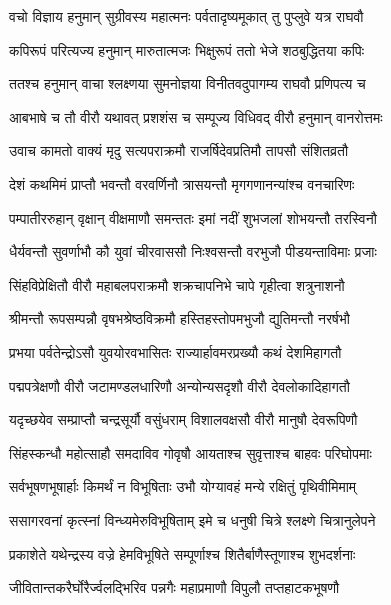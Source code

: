 
\twolineshloka
{वचो विज्ञाय हनुमान् सुग्रीवस्य महात्मनः}
{पर्वतादृष्यमूकात् तु पुप्लुवे यत्र राघवौ} %

\twolineshloka
{कपिरूपं परित्यज्य हनुमान् मारुतात्मजः}
{भिक्षुरूपं ततो भेजे शठबुद्धितया कपिः} %

\twolineshloka
{ततश्च हनुमान् वाचा श्लक्ष्णया सुमनोज्ञया}
{विनीतवदुपागम्य राघवौ प्रणिपत्य च} %

\twolineshloka
{आबभाषे च तौ वीरौ यथावत् प्रशशंस च}
{सम्पूज्य विधिवद् वीरौ हनुमान् वानरोत्तमः} %

\twolineshloka
{उवाच कामतो वाक्यं मृदु सत्यपराक्रमौ}
{राजर्षिदेवप्रतिमौ तापसौ संशितव्रतौ} %

\twolineshloka
{देशं कथमिमं प्राप्तौ भवन्तौ वरवर्णिनौ}
{त्रासयन्तौ मृगगणानन्यांश्च वनचारिणः} %

\twolineshloka
{पम्पातीररुहान् वृक्षान् वीक्षमाणौ समन्ततः}
{इमां नदीं शुभजलां शोभयन्तौ तरस्विनौ} %

\twolineshloka
{धैर्यवन्तौ सुवर्णाभौ कौ युवां चीरवाससौ}
{निःश्वसन्तौ वरभुजौ पीडयन्ताविमाः प्रजाः} %

\twolineshloka
{सिंहविप्रेक्षितौ वीरौ महाबलपराक्रमौ}
{शक्रचापनिभे चापे गृहीत्वा शत्रुनाशनौ} %

\twolineshloka
{श्रीमन्तौ रूपसम्पन्नौ वृषभश्रेष्ठविक्रमौ}
{हस्तिहस्तोपमभुजौ द्युतिमन्तौ नरर्षभौ} %

\twolineshloka
{प्रभया पर्वतेन्द्रोऽसौ युवयोरवभासितः}
{राज्यार्हावमरप्रख्यौ कथं देशमिहागतौ} %

\twolineshloka
{पद्मपत्रेक्षणौ वीरौ जटामण्डलधारिणौ}
{अन्योन्यसदृशौ वीरौ देवलोकादिहागतौ} %

\twolineshloka
{यदृच्छयेव सम्प्राप्तौ चन्द्रसूर्यौ वसुंधराम्}
{विशालवक्षसौ वीरौ मानुषौ देवरूपिणौ} %

\twolineshloka
{सिंहस्कन्धौ महोत्साहौ समदाविव गोवृषौ}
{आयताश्च सुवृत्ताश्च बाहवः परिघोपमाः} %

\twolineshloka
{सर्वभूषणभूषार्हाः किमर्थं न विभूषिताः}
{उभौ योग्यावहं मन्ये रक्षितुं पृथिवीमिमाम्} %

\twolineshloka
{ससागरवनां कृत्स्नां विन्ध्यमेरुविभूषिताम्}
{इमे च धनुषी चित्रे श्लक्ष्णे चित्रानुलेपने} %

\twolineshloka
{प्रकाशेते यथेन्द्रस्य वज्रे हेमविभूषिते}
{सम्पूर्णाश्च शितैर्बाणैस्तूणाश्च शुभदर्शनाः} %

\twolineshloka
{जीवितान्तकरैर्घोरैर्ज्वलद्भिरिव पन्नगैः}
{महाप्रमाणौ विपुलौ तप्तहाटकभूषणौ} %

